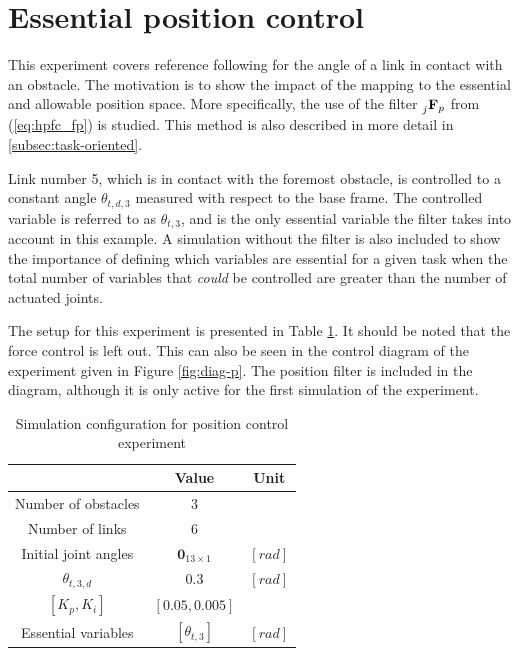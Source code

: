 \section{Essential position control}\label{sec:ess-pos}

This experiment covers reference following for the angle of a link in contact with an obstacle. The motivation is to show the impact of the mapping to the essential and allowable position space. More specifically, the use of the filter $\prescript{}{j}{\mathbf{F}}_{p}$ from (\ref{eq:hpfc_fp}) is studied. This method is also described in more detail in \ref{subsec:task-oriented}.

Link number 5, which is in contact with the foremost obstacle, is controlled to a constant angle $\theta_{t,d,3}$ measured with respect to the base frame. The controlled variable is referred to as $\theta_{t,3}$, and is the only essential variable the filter takes into account in this example. A simulation without the filter is also included to show the importance of defining which variables are essential for a given task when the total number of variables that \textit{could} be controlled are greater than the number of actuated joints.

The setup for this experiment is presented in Table \ref{tab:exp_single_pos}. It should be noted that the force control is left out. This can also be seen in the control diagram of the experiment given in Figure \ref{fig:diag-p}. The position filter is included in the diagram, although it is only active for the first simulation of the experiment.

\begin{table}[]
    \centering
    \begin{tabular}{|c|c|c|}
        \hline
        & Value & Unit\\
        \hline
        Number of obstacles & $3$ & \\
        Number of links & $6$ & \\
        Initial joint angles & $\mathbf{0}_{13 \times 1}$ & $[rad]$ \\
        $\theta_{t,3,d}$ & $0.3$ & $[rad]$ \\
        $[K_p, K_i]$ & $[0.05, 0.005]$ &\\
        Essential variables & $[\theta_{t,3}]$ & $[rad]$ \\
        \hline
    \end{tabular}
    \caption{Simulation configuration for position control experiment}
    \label{tab:exp_single_pos}
\end{table}

